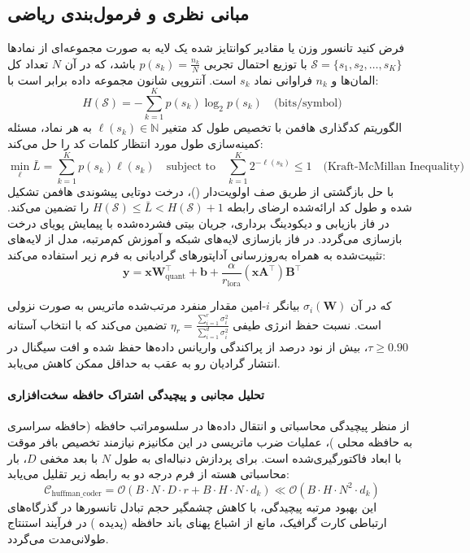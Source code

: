\subsection{مبانی نظری و فرمول‌بندی ریاضی}
فرض کنید تانسور وزن یا مقادیر کوانتایز شده یک لایه به صورت مجموعه‌ای از نمادها $\mathcal{S} = \{s_1, s_2, \dots, s_K\}$ با توزیع احتمال تجربی $p(s_k) = \frac{n_k}{N}$ باشد، که در آن $N$ تعداد کل المان‌ها و $n_k$ فراوانی نماد $s_k$ است. آنتروپی شانون مجموعه داده برابر است با:
\begin{equation}
H(\mathcal{S}) = -\sum_{k=1}^K p(s_k) \log_2 p(s_k) \quad \text{(bits/symbol)}
\end{equation}
الگوریتم کدگذاری هافمن با تخصیص طول کد متغیر $\ell(s_k) \in \mathbb{N}$ به هر نماد، مسئله کمینه‌سازی طول مورد انتظار کلمات کد را حل می‌کند:
\begin{equation}
\min_{\ell} \bar{L} = \sum_{k=1}^K p(s_k) \ell(s_k) \quad \text{subject to} \quad \sum_{k=1}^K 2^{-\ell(s_k)} \le 1 \quad \text{(Kraft-McMillan Inequality)}
\end{equation}
با حل بازگشتی از طریق صف اولویت‌دار ()، درخت دوتایی پیشوندی هافمن تشکیل شده و طول کد ارائه‌شده ارضای رابطه $H(\mathcal{S}) \le \bar{L} < H(\mathcal{S}) + 1$ را تضمین می‌کند. در فاز بازیابی و دیکودینگ برداری، جریان بیتی فشرده‌شده با پیمایش پویای درخت بازسازی می‌گردد. در فاز بازسازی لایه‌های شبکه و آموزش کم‌مرتبه، مدل از لایه‌های تثبیت‌شده به همراه به‌روزرسانی آداپتورهای گرادیانی به فرم زیر استفاده می‌کند:
\begin{equation}
\mathbf{y} = \mathbf{x} \mathbf{W}_{\text{quant}}^\top + \mathbf{b} + \frac{\alpha}{r_{\text{lora}}} (\mathbf{x} \mathbf{A}^\top) \mathbf{B}^\top
\end{equation}

که در آن $\sigma_i(\mathbf{W})$ بیانگر $i$-امین مقدار منفرد مرتب‌شده ماتریس به صورت نزولی است. نسبت حفظ انرژی طیفی $\eta_r = \frac{\sum_{i=1}^r \sigma_i^2}{\sum_{i=1}^{d} \sigma_i^2}$ تضمین می‌کند که با انتخاب آستانه $\tau \ge 0.90$، بیش از نود درصد از پراکندگی واریانس داده‌ها حفظ شده و افت سیگنال در انتشار گرادیان رو به عقب به حداقل ممکن کاهش می‌یابد.

\paragraph{تحلیل مجانبی و پیچیدگی اشتراک حافظه سخت‌افزاری}
از منظر پیچیدگی محاسباتی و انتقال داده‌ها در سلسومراتب حافظه (حافظه سراسری  به حافظه محلی )، عملیات ضرب ماتریسی در این مکانیزم نیازمند تخصیص بافر موقت با ابعاد فاکتورگیری‌شده است. برای پردازش دنباله‌ای به طول $N$ با بعد مخفی $D$، بار محاسباتی هسته از فرم درجه دو به رابطه زیر تقلیل می‌یابد:
\begin{equation}
\label{eq:complexity_huffman_coder}
\mathcal{C}_{\text{huffman\_coder}} = \mathcal{O}\left( B \cdot N \cdot D \cdot r + B \cdot H \cdot N \cdot d_k \right) \ll \mathcal{O}\left( B \cdot H \cdot N^2 \cdot d_k \right)
\end{equation}
این بهبود مرتبه پیچیدگی، با کاهش چشمگیر حجم تبادل تانسورها در گذرگاه‌های ارتباطی کارت گرافیک، مانع از اشباع پهنای باند حافظه (پدیده ) در فرآیند استنتاج طولانی‌مدت می‌گردد.
